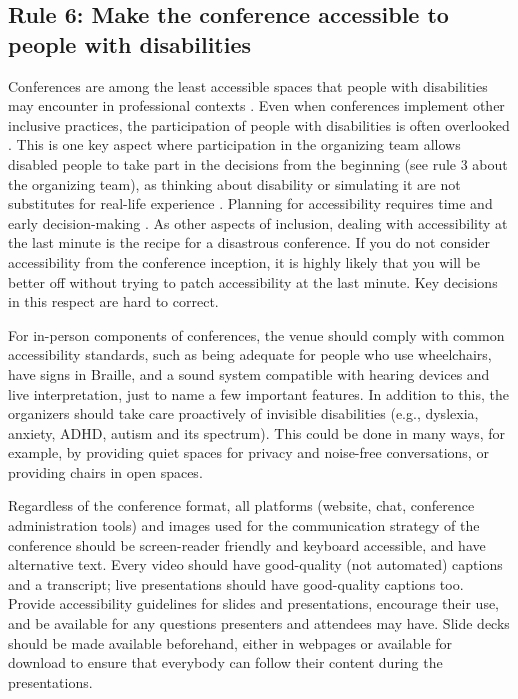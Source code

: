 \documentclass[10pt,letterpaper]{article}
\begin{document}
\subsection*{Rule 6: Make the conference accessible to people with disabilities}
\label{rule_accessibility}

Conferences are among the least accessible spaces that people with disabilities may encounter in professional contexts \cite{priceAccessImaginedConstruction2009}. Even when conferences implement other inclusive practices, the participation of people with disabilities is often overlooked \cite{marks2021meeting}. This is one key aspect where participation in the organizing team allows disabled people to take part in the decisions from the beginning (see rule 3 about the organizing team), as thinking about disability or simulating it are not substitutes for real-life experience \cite{costanzachockDesign2020}. Planning for accessibility requires time and early decision-making \cite{irishIncreasingParticipationUsing2020}. As other aspects of inclusion, dealing with accessibility at the last minute is the recipe for a disastrous conference. If you do not consider accessibility from the conference inception, it is highly likely that you will be better off without trying to patch accessibility at the last minute. Key decisions in this respect are hard to correct.

For in-person components of conferences, the venue should comply with common accessibility standards, such as being adequate for people who use wheelchairs, have signs in Braille, and a sound system compatible with hearing devices and live interpretation, just to name a few important features. In addition to this, the organizers should take care proactively of invisible disabilities (e.g., dyslexia, anxiety, ADHD, autism and its spectrum). This could be done in many ways, for example, by providing quiet spaces for privacy and noise-free conversations, or providing chairs in open spaces.

Regardless of the conference format, all platforms (website, chat, conference administration tools) and images used for the communication strategy of the conference should be screen-reader friendly and keyboard accessible, and have alternative text. Every video should have good-quality (not automated) captions and a transcript; live presentations should have good-quality captions too. 
Provide accessibility guidelines for slides and presentations, encourage their use, and be available for any questions presenters and attendees may have. Slide decks should be made available beforehand, either in webpages or available for download to ensure that everybody can follow their content during the presentations. 
\end{document}

